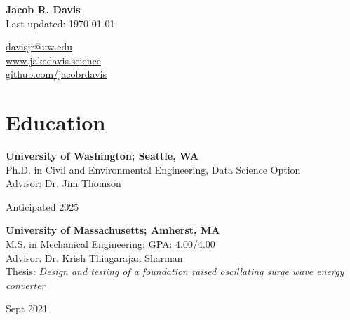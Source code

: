 \documentclass[letterpaper,11pt]{article}
\begin{document}
\begin{minipage}[c][0.5in]{.65\textwidth}
  \flushleft
  \textbf{\LARGE Jacob R. Davis}\\
  \vspace{9pt}
  Last updated: \monthyeardate\today
\end{minipage}
\hfill
\begin{minipage}[c][0.5in]{.30\textwidth}
  \flushright
  \href{mailto:jacrdavis@umass.edu}{davisjr@uw.edu}\\
  \href{http://jakedavis.science/}{www.jakedavis.science}\\
  \href{https://github.com/jacobrdavis}{github.com/jacobrdavis}\\
\end{minipage}



\section{Education}

\begin{minipage}[t]{.7\textwidth}
  \flushleft
  \textbf{University of Washington; Seattle, WA}\\
  Ph.D. in Civil and Environmental Engineering, Data Science Option\\
  Advisor: Dr. Jim Thomson
\end{minipage}
  \hfill
  \begin{minipage}[t]{.25\textwidth}
  \flushright
  Anticipated 2025\\
\end{minipage}

\vspace{7pt}

\begin{minipage}[t]{.89\textwidth}
\flushleft
\textbf{University of Massachusetts; Amherst, MA}\\
M.S. in Mechanical Engineering; GPA: 4.00/4.00 \\
Advisor: Dr. Krish Thiagarajan Sharman \\
Thesis: \textit{Design and testing of a foundation raised oscillating surge wave energy converter} %
\end{minipage}
\hfill
\begin{minipage}[t]{.1\textwidth}
\flushright
Sept 2021\\
\end{minipage}
\end{document}

